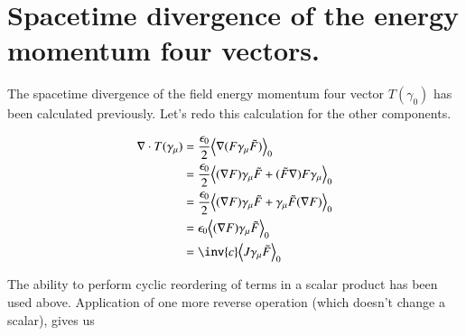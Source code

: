 \documentclass{article}
\begin{document}
%
%

\section{ Spacetime divergence of the energy momentum four vectors. }

The spacetime divergence of the field energy momentum four vector $T(\gamma_0)$ has been calculated previously.  Let's redo this 
calculation for the other components.

\begin{align*}
\grad \cdot T(\gamma_\mu) 
&= \frac{\epsilon_0}{2} \gpgradezero{ \grad (F \gamma_\mu \tilde{F}) } \\
&= \frac{\epsilon_0}{2} \gpgradezero{ (\grad F) \gamma_\mu \tilde{F} + (\tilde{F} \grad) F \gamma_\mu } \\
&= \frac{\epsilon_0}{2} \gpgradezero{ (\grad F) \gamma_\mu \tilde{F} + \gamma_\mu \tilde{F} (\grad F) } \\
&= {\epsilon_0} \gpgradezero{ (\grad F) \gamma_\mu \tilde{F} } \\
&= \inv{c} \gpgradezero{ J \gamma_\mu \tilde{F} } \\
\end{align*}

The ability to perform cyclic reordering of terms in a scalar product has been used above.  Application of one more
reverse operation (which doesn't change a scalar), gives us
\end{document}
